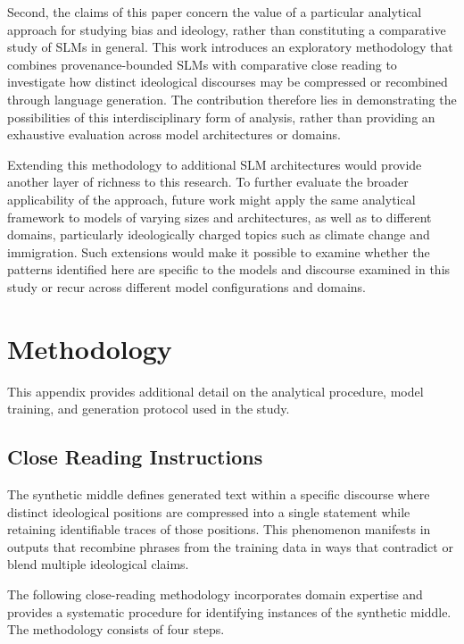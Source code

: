 \documentclass[anonymous,review]{acmart}
\begin{document}
Second, the claims of this paper concern the value of a particular analytical approach for studying bias and ideology, rather than constituting a comparative study of SLMs in general. This work introduces an exploratory methodology that combines provenance-bounded SLMs with comparative close reading to investigate how distinct ideological discourses may be compressed or recombined through language generation. The contribution therefore lies in demonstrating the possibilities of this interdisciplinary form of analysis, rather than providing an exhaustive evaluation across model architectures or domains.

Extending this methodology to additional SLM architectures would provide another layer of richness to this research. To further evaluate the broader applicability of the approach, future work might apply the same analytical framework to models of varying sizes and architectures, as well as to different domains, particularly ideologically charged topics such as climate change and immigration. Such extensions would make it possible to examine whether the patterns identified here are specific to the models and discourse examined in this study or recur across different model configurations and domains.




\appendix

\section{Methodology}
\label{appendix:methodology}

This appendix provides additional detail on the analytical procedure, model training, and generation protocol used in the study.

\subsection{Close Reading Instructions}
\label{appendix:close-reading}

The synthetic middle defines generated text within a specific discourse where distinct ideological positions are compressed into a single statement while retaining identifiable traces of those positions. This phenomenon manifests in outputs that recombine phrases from the training data in ways that contradict or blend multiple ideological claims.

The following close-reading methodology incorporates domain expertise and provides a systematic procedure for identifying instances of the synthetic middle. The methodology consists of four steps.
\end{document}

